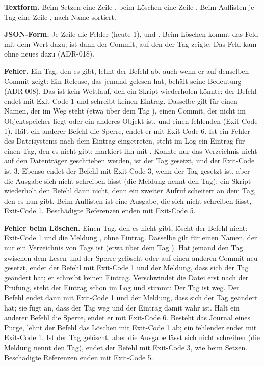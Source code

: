 {\bf Textform.} Beim Setzen eine Zeile , beim Löschen eine Zeile
. Beim Auflisten je Tag eine Zeile ,
nach Name sortiert.

{\bf JSON-Form.} Je Zeile die Felder  (heute 1),  und . Beim
Löschen kommt das Feld  mit dem Wert  dazu;  ist dann der
Commit, auf den der Tag zeigte. Das Feld kam ohne neues  dazu (ADR-018).

{\bf Fehler.} Ein Tag, den es gibt, lehnt der Befehl ab, auch wenn er auf denselben Commit zeigt:
Ein Release, das jemand gelesen hat, behält seine Bedeutung (ADR-008). Das ist kein Wettlauf,
den ein Skript wiederholen könnte; der Befehl endet mit Exit-Code 1 und schreibt keinen Eintrag.
Dasselbe gilt für einen Namen, der im Weg steht (etwa  über dem Tag ), einen
Commit, der nicht im Objektspeicher liegt oder ein anderes Objekt ist, und einen fehlenden
 (Exit-Code 1). Hält ein anderer Befehl die Sperre, endet er mit Exit-Code 6.
Ist ein Fehler des Dateisystems nach dem Eintrag eingetreten, steht im Log ein Eintrag für einen
Tag, den es nicht gibt;  markiert ihn mit \type{!}.
Konnte nur das Verzeichnis nicht auf den Datenträger geschrieben werden,
ist der Tag gesetzt, und der Exit-Code ist 3.
Ebenso endet der Befehl mit Exit-Code 3, wenn der Tag gesetzt ist, aber die Ausgabe sich nicht
schreiben lässt (die Meldung nennt den Tag); ein Skript wiederholt den Befehl dann nicht, denn ein
zweiter Aufruf scheitert an dem Tag, den es nun gibt. Beim Auflisten ist eine Ausgabe, die sich
nicht schreiben lässt, Exit-Code 1. Beschädigte Referenzen enden mit Exit-Code 5.

{\bf Fehler beim Löschen.} Einen Tag, den es nicht gibt, löscht der Befehl nicht: Exit-Code 1 und
die Meldung , ohne Eintrag. Dasselbe gilt für einen
Namen, der nur ein Verzeichnis von Tags ist (etwa  über dem Tag ). Hat jemand
den Tag zwischen dem Lesen und der Sperre gelöscht oder auf einen anderen Commit neu gesetzt,
endet der Befehl mit Exit-Code 1 und der Meldung, dass sich der Tag geändert hat; er schreibt
keinen Eintrag. Verschwindet die Datei erst nach der Prüfung, steht der Eintrag schon im Log
und stimmt: Der Tag ist weg. Der Befehl endet dann mit Exit-Code 1 und der Meldung, dass sich
der Tag geändert hat; sie fügt an, dass der Tag weg und der Eintrag damit wahr ist.
Hält ein anderer Befehl die Sperre, endet er mit Exit-Code 6.
Besteht das Journal eines Purge, lehnt der Befehl das Löschen mit Exit-Code 1 ab; ein fehlender
 endet mit Exit-Code 1. Ist der Tag gelöscht, aber die Ausgabe lässt sich nicht
schreiben (die Meldung nennt den Tag), endet der Befehl mit Exit-Code 3, wie beim Setzen.
Beschädigte Referenzen enden mit Exit-Code 5.

